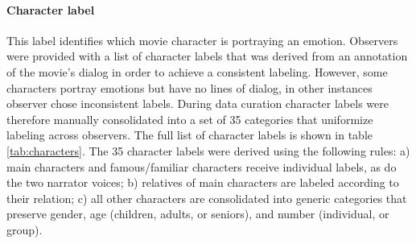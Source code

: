 \documentclass[10pt,a4paper,twocolumn]{article}
\begin{document}
\paragraph{Character label}

This label identifies which movie character is portraying an emotion. Observers
were provided with a list of character labels that was derived from an
annotation of the movie's dialog in order to achieve a consistent labeling.
However, some characters portray emotions but have no lines of dialog, in other
instances observer chose inconsistent labels. During data curation character
labels were therefore manually consolidated into a set of 35 categories that
uniformize labeling across observers. The full list of character labels is
shown in table \ref{tab:characters}. The 35 character labels were derived using
the following rules: a) main characters and famous/familiar characters receive
individual labels, as do the two narrator voices; b) relatives of main
characters are labeled according to their relation; c) all other characters are
consolidated into generic categories that preserve gender, age (children,
adults, or seniors), and number (individual, or group).
\end{document}
